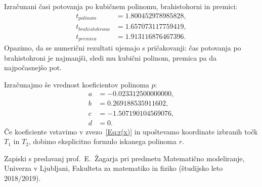 \documentclass[a4paper]{article}
\begin{document}
Izračunani časi potovanja po kubičnem polinomu, brahistohorni in premici:
\begin{align*}
t_{polinom} &= 1.800452978985828, \\
t_{brahistohrona} &= 1.657073117759419, \\
t_{premica} &= 1.913116876467396.
\end{align*}
%
Opazimo, da se numerični rezultati ujemajo s pričakovanji: čas potovanja po brahistohroni je najmanjši, sledi mu kubični polinom, premica pa da najpočasnejšo pot.

Izračunajmo še vrednost koeficientov polinoma $p$:
\begin{align*}
a &= -0.023312500000000, \\
b &= 0.269188535911602, \\ 
c &= -1.507190104569076, \\ 
d &= 0.
\end{align*}
Če koeficiente vstavimo v zvezo~\eqref{Eq:r(x)} in upoštevamo koordinate izbranih točk $T_1$ in $T_2$, dobimo eksplicitno formulo iskanega polinoma $r$.


\begin{thebibliography}{99}

 Zapiski s predavanj prof.~E.~Žagarja pri predmetu Matematično modeliranje, Univerza v Ljubljani, Fakulteta za matematiko in fiziko (študijsko leto 2018/2019).

\end{thebibliography}
\end{document}
